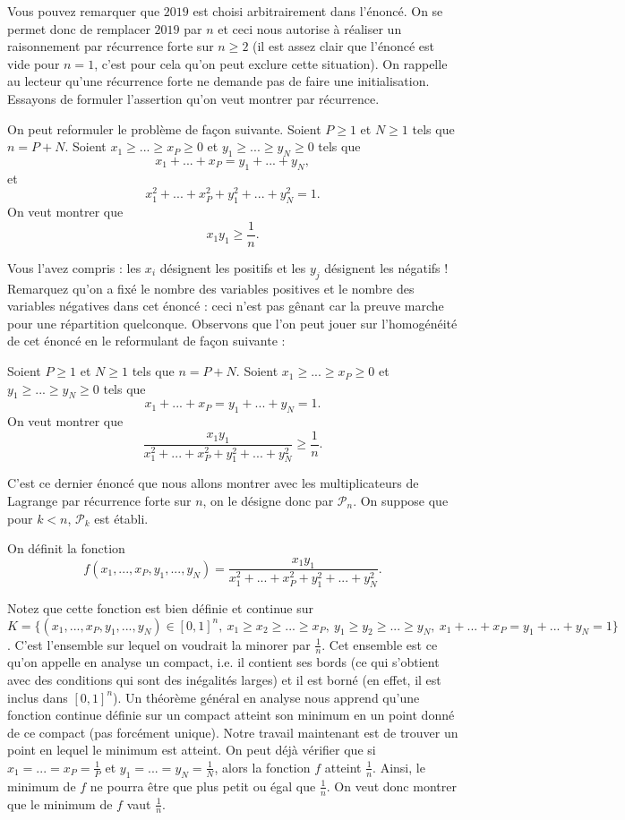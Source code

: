 \begin{sol}
Vous pouvez remarquer que $2019$ est choisi arbitrairement dans l'énoncé. On se permet donc de remplacer $2019$ par $n$ et ceci nous autorise à réaliser un raisonnement par récurrence forte sur $n \geq 2$ (il est assez clair que l'énoncé est vide pour $n=1$, c'est pour cela qu'on peut exclure cette situation). On rappelle au lecteur qu'une récurrence forte ne demande pas de faire une initialisation. Essayons de formuler l'assertion qu'on veut montrer par récurrence.

On peut reformuler le problème de façon suivante. Soient $P \geq 1$ et $N \geq 1$ tels que $n=P+N$. Soient $x_1\geq...\geq x_P \geq 0$ et $y_1 \geq ...\geq y_N \geq 0$ tels que
\[
x_1 + ... + x_P = y_1 + ... + y_N,
\]
et
\[
x_1^2 + ... + x_P^2 + y_1^2 + ... + y_N^2 = 1.
\]
On veut montrer que
\[
x_1 y_1 \geq \frac1{n}.
\]

Vous l'avez compris : les $x_i$ désignent les positifs et les $y_j$ désignent les négatifs ! Remarquez qu'on a fixé le nombre des variables positives et le nombre des variables négatives dans cet énoncé : ceci n'est pas gênant car la preuve marche pour une répartition quelconque. Observons que l'on peut jouer sur l'homogénéité de cet énoncé en le reformulant de façon suivante :

Soient $P \geq 1$ et $N \geq 1$ tels que $n=P+N$. Soient $x_1\geq...\geq x_P \geq 0$ et $y_1 \geq ...\geq y_N \geq 0$ tels que
\[
x_1 + ... + x_P = y_1 + ... + y_N = 1.
\]
On veut montrer que
\[
\frac{x_1 y_1}{x_1^2 + ... + x_P^2 + y_1^2 + ... + y_N^2} \geq \frac1{n}.
\]

C'est ce dernier énoncé que nous allons montrer avec les multiplicateurs de Lagrange par récurrence forte sur $n$, on le désigne donc par $\mathcal{P}_n$. On suppose que pour $k<n$, $\mathcal{P}_k$ est établi.

On définit la fonction
\[
f(x_1,...,x_P,y_1,...,y_N)=\frac{x_1 y_1}{x_1^2 + ... + x_P^2 + y_1^2 + ... + y_N^2}.
\]

Notez que cette fonction est bien définie et continue sur $K=\{(x_1,...,x_P,y_1,...,y_N) \in [0,1]^{n},\ x_1 \geq x_2 \geq ... \geq x_P,\ y_1 \geq y_2 \geq ... \geq y_N,\ x_1 + ... + x_P = y_1 + ... + y_N = 1 \}$. C'est l'ensemble sur lequel on voudrait la minorer par $\frac1{n}$. Cet ensemble est ce qu'on appelle en analyse un compact, i.e. il contient ses bords (ce qui s'obtient avec des conditions qui sont des inégalités larges) et il est borné (en effet, il est inclus dans $[0,1]^{n}$). Un théorème général en analyse nous apprend qu'une fonction continue définie sur un compact atteint son minimum en un point donné de ce compact (pas forcément unique). Notre travail maintenant est de trouver un point en lequel le minimum est atteint. On peut déjà vérifier que si $x_1 = ... = x_P = \frac1{P}$ et $y_1 = ... =y_N = \frac1{N}$, alors la fonction $f$ atteint $\frac1{n}$. Ainsi, le minimum de $f$ ne pourra être que plus petit ou égal que $\frac1{n}$. On veut donc montrer que le minimum de $f$ vaut $\frac1{n}$.


\end{sol}

